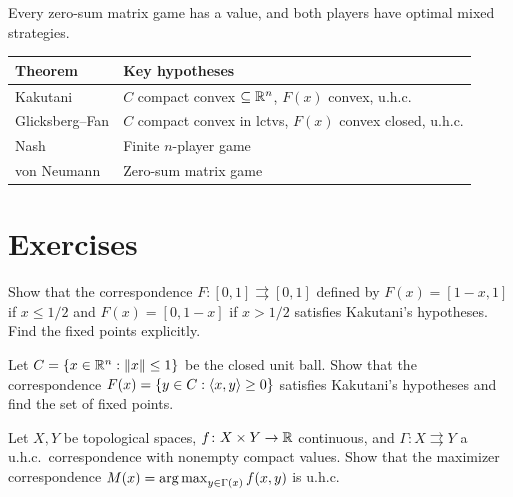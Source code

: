 \begin{corollary}
Every zero-sum matrix game has a value, and both players have optimal mixed strategies.
\end{corollary}

\begin{keyformulas}[title=\textbf{Summary}]
\begin{center}
\renewcommand{\arraystretch}{1.3}
\begin{tabular}{|l|l|}
\hline
\textbf{Theorem} & \textbf{Key hypotheses} \\
\hline
Kakutani & $C$ compact convex $\subseteq \mathbb{R}^n$, $F(x)$ convex, u.h.c. \\
Glicksberg--Fan & $C$ compact convex in lctvs, $F(x)$ convex closed, u.h.c. \\
Nash & Finite $n$-player game \\
von Neumann & Zero-sum matrix game \\
\hline
\end{tabular}
\end{center}
\end{keyformulas}

\section{Exercises}

\begin{exercise}
Show that the correspondence $F\colon [0,1] \rightrightarrows [0,1]$ defined by
$F(x) = [1-x, 1]$ if $x \leq 1/2$ and $F(x) = [0, 1-x]$ if $x > 1/2$ satisfies
Kakutani's hypotheses. Find the fixed points explicitly.
\end{exercise}

\begin{exercise}
Let $C = \{x \in \mathbb{R}^n : \left\| x \right\| \leq 1\}$ be the closed unit ball. Show that the
correspondence $F(x) = \{y \in C : \langle x, y \rangle \geq 0\}$ satisfies Kakutani's
hypotheses and find the set of fixed points.
\end{exercise}

\begin{exercise}
Let $X, Y$ be topological spaces, $f\colon X \times Y \to \mathbb{R}$ continuous, and
$\Gamma\colon X \rightrightarrows Y$ a u.h.c.\ correspondence with nonempty compact
values. Show that the maximizer correspondence $M(x) = \operatorname*{arg\,max}_{y \in \Gamma(x)} f(x,y)$
is u.h.c.
\end{exercise}

